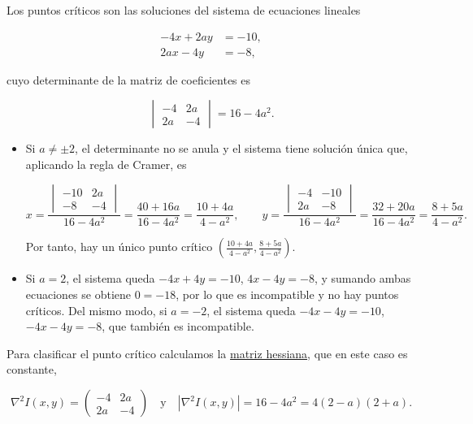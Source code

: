 \documentclass[
  spanish,
  a4paper,
]{scrreport}
\theoremstyle{definition}
\theoremstyle{remark}
\begin{document}
\begin{tcolorbox}
\begin{enumerate}
  Los puntos críticos son las soluciones del sistema de ecuaciones
  lineales

  \begin{align*}
  -4x + 2ay &= -10, \\
  2ax - 4y &= -8,
  \end{align*}

  cuyo determinante de la matriz de coeficientes es

  \[
  \begin{vmatrix}
  -4 & 2a \\
  2a & -4
  \end{vmatrix}
  = 16 - 4a^2.
  \]

  \begin{itemize}
  \item
    Si \(a\neq \pm 2\), el determinante no se anula y el sistema tiene
    solución única que, aplicando la regla de Cramer, es

    \[
    x = \frac{\begin{vmatrix} -10 & 2a \\ -8 & -4 \end{vmatrix}}{16-4a^2} = \frac{40 + 16a}{16-4a^2} = \frac{10+4a}{4-a^2}, \qquad
    y = \frac{\begin{vmatrix} -4 & -10 \\ 2a & -8 \end{vmatrix}}{16-4a^2} = \frac{32 + 20a}{16-4a^2} = \frac{8+5a}{4-a^2}.
    \]

    Por tanto, hay un único punto crítico
    \(\left(\frac{10+4a}{4-a^2}, \frac{8+5a}{4-a^2}\right)\).
  \item
    Si \(a = 2\), el sistema queda \(-4x + 4y = -10\), \(4x - 4y = -8\),
    y sumando ambas ecuaciones se obtiene \(0 = -18\), por lo que es
    incompatible y no hay puntos críticos. Del mismo modo, si \(a=-2\),
    el sistema queda \(-4x - 4y = -10\), \(-4x - 4y = -8\), que también
    es incompatible.
  \end{itemize}

  Para clasificar el punto crítico calculamos la
  \href{https://aprendeconalf.es/analisis-manual/13-derivadas-funciones-varias-variables.html\#def-matriz-hessiana}{matriz
  hessiana}, que en este caso es constante,

  \[
  \nabla^2 I(x,y) = 
  \begin{pmatrix}
  -4 & 2a \\
  2a & -4
  \end{pmatrix}
  \quad\mbox{y}\quad
  |\nabla^2 I(x,y)| = 16 - 4a^2 = 4(2-a)(2+a).
  \]


\end{enumerate}
\end{tcolorbox}
\end{document}
